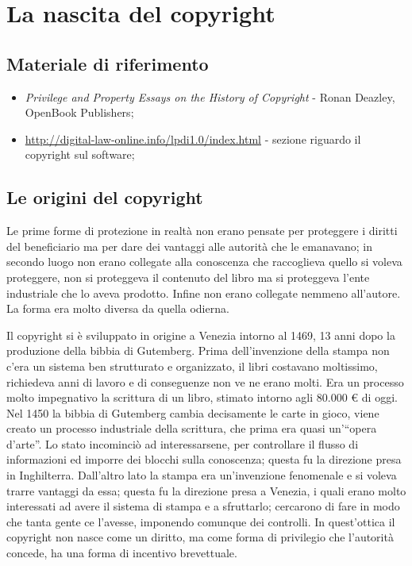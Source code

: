 \section{La nascita del copyright}

\subsection*{Materiale di riferimento}

\begin{itemize}

\item \textit{Privilege and Property Essays on the History of Copyright} - Ronan Deazley, OpenBook Publishers;
\item \url{http://digital-law-online.info/lpdi1.0/index.html} - sezione riguardo il copyright sul software;

\end{itemize}

\subsection{Le origini del copyright}

Le prime forme di protezione in realtà non erano pensate per proteggere i diritti del beneficiario ma per dare dei vantaggi alle autorità che le emanavano; in secondo luogo non erano collegate alla conoscenza che raccoglieva quello si voleva proteggere, non si proteggeva il contenuto del libro ma si proteggeva l'ente industriale che lo aveva prodotto. Infine non erano collegate nemmeno all'autore. La forma era molto diversa da quella odierna.

Il copyright si è sviluppato in origine a Venezia intorno al 1469, 13 anni dopo la produzione della bibbia di Gutemberg. Prima dell'invenzione della stampa non c'era un sistema ben strutturato e organizzato, il libri costavano moltissimo, richiedeva anni di lavoro e di conseguenze non ve ne erano molti. Era un processo molto impegnativo la scrittura di un libro, stimato intorno agli 80.000 \euro{} di oggi. Nel 1450 la bibbia di Gutemberg cambia decisamente le carte in gioco, viene creato un processo industriale della scrittura, che prima era quasi un'``opera d'arte''. Lo stato incominciò ad interessarsene, per controllare il flusso di informazioni ed imporre dei blocchi sulla conoscenza; questa fu la direzione presa in Inghilterra. Dall'altro lato la stampa era un'invenzione fenomenale e si voleva trarre vantaggi da essa; questa fu la direzione presa a Venezia, i quali erano molto interessati ad avere il sistema di stampa e a sfruttarlo; cercarono di fare in modo che tanta gente ce l'avesse, imponendo comunque dei controlli. In quest'ottica il copyright non nasce come un diritto, ma come forma di privilegio che l'autorità concede, ha una forma di incentivo brevettuale.

